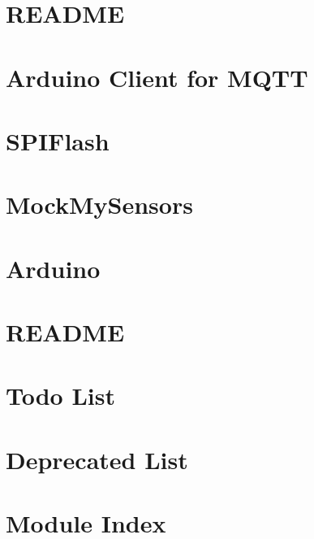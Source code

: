 \let\mypdfximage\pdfximage\def\pdfximage{\immediate\mypdfximage}\documentclass[twoside]{book}
\newcommand{\+}{\discretionary{\mbox{\scriptsize$\hookleftarrow$}}{}{}}
\begin{document}
\chapter{R\+E\+A\+D\+ME}
\label{md_drivers__n_v_m__r_e_a_d_m_e}

\chapter{Arduino Client for M\+Q\+TT}
\label{md_drivers__pub_sub_client__r_e_a_d_m_e}

\chapter{S\+P\+I\+Flash}
\label{md_drivers__s_p_i_flash__r_e_a_d_m_e}

\chapter{Mock\+My\+Sensors}
\label{md_examples__mock_my_sensors__r_e_a_d_m_e}

\chapter{Arduino}
\label{md_hal_crypto_generic_drivers__a_e_s__r_e_a_d_m_e}

\chapter{R\+E\+A\+D\+ME}
\label{md__r_e_a_d_m_e}

\chapter{Todo List}
\label{todo}

\chapter{Deprecated List}
\label{deprecated}

\chapter{Module Index}

\end{document}
